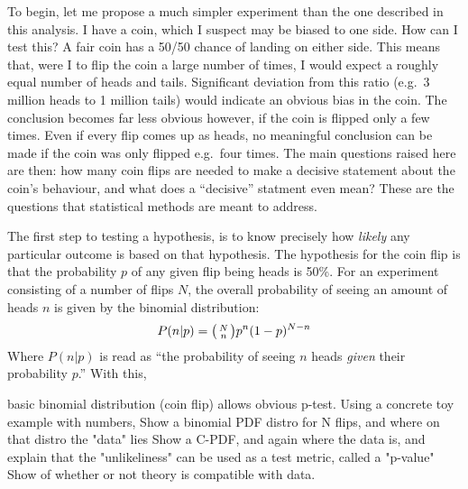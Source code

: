     To begin, let me propose a much simpler experiment than the one described in this analysis.
    I have a coin, which I suspect may be biased to one side.
    How can I test this?
    A fair coin has a 50/50 chance of landing on either side.
    This means that, were I to flip the coin a large number of times,
        I would expect a roughly equal number of heads and tails.
    Significant deviation from this ratio (e.g.\ 3 million heads to 1 million tails)
        would indicate an obvious bias in the coin.
    The conclusion becomes far less obvious however, if the coin is flipped only a few times.
    Even if every flip comes up as heads, no meaningful conclusion can be made if the coin was only flipped e.g.\ four times.
    The main questions raised here are then:
        how many coin flips are needed to make a decisive statement about the coin's behaviour,
        and what does a ``decisive'' statment even mean?
    These are the questions that statistical methods are meant to address.

    The first step to testing a hypothesis,
        is to know precisely how \textit{likely} any particular outcome is based on that hypothesis.
    The hypothesis for the coin flip is that the probability $p$ of any given flip being heads is 50\%.
    For an experiment consisting of a number of flips $N$,
        the overall probability of seeing an amount of heads $n$ is given by the binomial distribution:
    \begin{equation}
        P(n|p) = \big(\begin{smallmatrix} N\\n \end{smallmatrix}\big) p^n (1-p)^{N-n}
    \end{equation}
    Where $P(n|p)$ is read as ``the probability of seeing $n$ heads \textit{given} their probability $p$.''
    With this, 
    
    basic binomial distribution (coin flip) allows obvious p-test. 
    Using a concrete toy example with numbers,
    Show a binomial PDF distro for N flips, and where on that distro the "data" lies
    Show a C-PDF, and again where the data is,
        and explain that the "unlikeliness" can be used as a test metric, called a "p-value"
    Show of whether or not theory is compatible with data.


